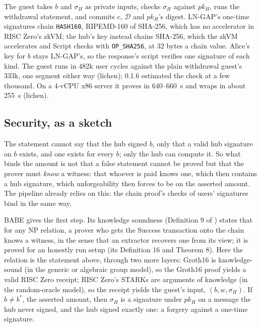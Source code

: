 \documentclass[11pt]{article}
\begin{document}
The guest takes $b$ and $\sigma_H$ as private inputs, checks $\sigma_H$
against $pk_H$, runs the withdrawal statement, and commits $c$,
$\mathcal{D}$ and $pk_H$'s digest. LN-GAP's one-time signatures chain
\texttt{HASH160}, RIPEMD-160 of SHA-256, which has no accelerator in RISC
Zero's zkVM; the hub's key instead chains SHA-256, which the zkVM
accelerates and Script checks with \texttt{OP\_SHA256}, at 32 bytes a
chain value. Alice's key for $b$ stays LN-GAP's, so the response's
script verifies one signature of each kind. The guest runs in 482k user
cycles against the plain withdrawal guest's 333k, one segment either way
(lichen); 0.1.6 estimated the check at a few thousand. On a 4-vCPU x86
server it proves in 640--660~s and wraps in about 255~s (lichen).

\subsection{Security, as a sketch}
\label{sec:security}

The statement cannot say that the hub signed $b$, only that a valid hub
signature on $b$ exists, and one exists for every $b$; only the hub can
compute it. So what binds the amount is not that a false statement
cannot be proved but that the prover must \emph{know} a witness: that
whoever is paid knows one, which then contains a hub signature, which
unforgeability then forces to be on the asserted amount. The pipeline
already relies on this: the chain proof's checks of users' signatures
bind in the same way.

BABE gives the first step. Its knowledge soundness (Definition 9 of
\cite{babe}) states that for any NP relation, a prover who gets the
Success transaction onto the chain knows a witness, in the sense that an
extractor recovers one from its view; it is proved for an honestly run
setup (its Definition 16 and Theorem 8). Here the relation is the
statement above, through two more layers: Groth16 is knowledge-sound
(in the generic or algebraic group model), so the Groth16 proof yields
a valid RISC Zero receipt; RISC Zero's STARKs are arguments of knowledge
(in the random-oracle model), so the receipt yields the guest's input,
$(b, w, \sigma_H)$. If $b \ne b^*$, the asserted amount, then $\sigma_H$
is a signature under $pk_H$ on a message the hub never signed, and the
hub signed exactly one: a forgery against a one-time signature.
\end{document}
